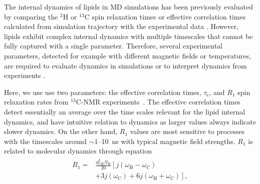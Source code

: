 \documentclass[journal=jpcbfk,manuscript=article,layout=twocolumn]{achemso}
\begin{document}
The internal dynamics of lipids in MD simulations has been previously evaluated by comparing
the $^2$H or $^{13}$C spin relaxation times or effective correlation times calculated from simulation
trajectory with the experimental data \cite{feller02,wohlert06,klauda08,klauda08II,ferreira15,ollila16}.
However, lipids exhibit complex internal dynamics with multiple timescales that cannot be fully captured
with a single parameter. Therefore, several experimental parameters, detected for example with different
magnetic fields or temperatures, are required to evaluate dynamics in simulations or to interpret dynamics
from experiments \cite{??}.

Here, we use use two parameters: the effective correlation times, $\tau_\mathrm{e}$, and $R_1$ spin relaxation rates
from $^{13}$C-NMR experiments~\cite{ferreira15,pham15,Volke:1995a}.
The effective correlation times detect essentially an average over the time scales relevant for the lipid internal dynamics,
and have intuitive relation to dynamics as larger values always indicate slower dynamics.  
%
%
On the other hand, $R_1$ values are most sensitive to processes with the timescales
around $\sim$1--10~ns with typical
magnetic field strengths. %
$R_1$ is related to molecular dynamics through equation
\begin{align}
\label{eq:R1}
\begin{split}
R_{1}=&\frac{d^2_{\mathrm{CH}}N_{\mathrm{H}}}{20}\left[j(\omega_{\mathrm{H}}-\omega_{\mathrm{C}})\right. \\
&\left.+3j(\omega_{\mathrm{C}})+6j(\omega_{\mathrm{H}}+\omega_{\mathrm{C}})\right] ,
\end{split}
\end{align}
\end{document}
